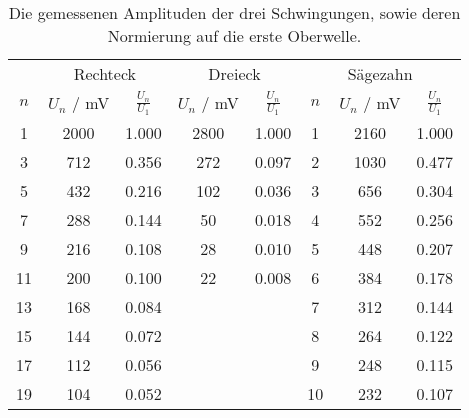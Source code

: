 \begin{table}[!htp]
\centering
\caption{Die gemessenen Amplituden der drei Schwingungen, sowie deren Normierung auf die erste Oberwelle.}
\label{tab:amplituden}
\begin{tabular}{c c c c c c c c }
\toprule
 & \multicolumn{2}{c}{Rechteck} & \multicolumn{2}{c}{Dreieck}  &  \multicolumn{3}{c}{Sägezahn}  \\
 \cmidrule(lr){2-3} 
  \cmidrule(lr){4-5}
   \cmidrule(lr){6-8}
{$n$} & {$U_n$ / mV} & {$\frac{U_n}{U_1}$} & {$U_n$ / mV} & {$\frac{U_n}{U_1}$} & {$n$} & {$U_n$ / mV} & {$\frac{U_n}{U_1}$}  \\
\midrule
  1 & 2000 & 1.000 & 2800  & 1.000 & 1 &  2160 & 1.000  \\
  3 &712 & 0.356   & 272 & 0.097   &2 &  1030 & 0.477\\
   5 &432 & 0.216  & 102 & 0.036   &3 &  656 & 0.304 \\
   7 &288 & 0.144  & 50 & 0.018    &4 &  552 & 0.256 \\
   9 &216 & 0.108  & 28 & 0.010    &5 &  448 & 0.207 \\
   11&200 & 0.100  & 22 & 0.008    &6 &  384 & 0.178 \\
   13& 168 & 0.084 &    &          &7 &  312 & 0.144 \\
   15& 144 & 0.072 &    &          &8 &  264 & 0.122 \\
   17& 112 & 0.056 &    &          &9 &  248 & 0.115 \\
   19& 104 & 0.052 &    &          &10 & 232 & 0.107 \\
\bottomrule
\end{tabular}
\end{table}